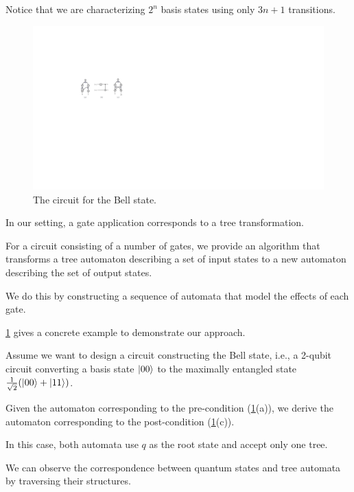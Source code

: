 Notice that we are characterizing $2^n$ basis states using only $3n+1$ transitions.


\begin{figure}
\includegraphics{Figures/Circuits/Bells}
\caption{The circuit for the Bell state.
  }
\label{Bells:fig}
\end{figure}

In our setting, a gate application corresponds to a tree transformation.

For a circuit consisting of a number of gates, we provide an algorithm that transforms a tree automaton describing a set of input states to a new automaton describing the set of output states.

We do this by constructing a sequence of automata that model the effects of each gate.

\cref{Bells:fig} gives a concrete example to demonstrate our approach.


Assume we want to design a circuit constructing the Bell state, i.e., a 2-qubit circuit converting a basis state $|00\rangle$ to the maximally entangled state $\frac{1}{\sqrt{2}}(|00\rangle + |11\rangle)$.

Given the automaton corresponding to the pre-condition (\cref{Bells:fig}(a)), we derive the automaton corresponding to the post-condition (\cref{Bells:fig}(c)).

In this case, both automata use $q$ as the root state and accept only one tree.

We can observe the correspondence between quantum states and tree automata by traversing their structures.

%
